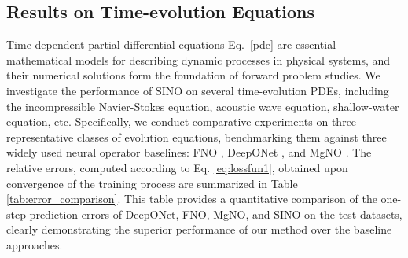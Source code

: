 \documentclass[preprint,numbers,sort&compress]{elsarticle}
\begin{document}
			
			\subsection{Results on Time-evolution Equations} \label{time_results}
			Time-dependent partial differential equations Eq.~\eqref{pde} are essential mathematical models for describing dynamic processes in physical systems, and their numerical solutions form the foundation of forward problem studies. We investigate the performance of SINO on several time-evolution PDEs, including the incompressible Navier-Stokes equation, acoustic wave equation, shallow-water equation, etc. Specifically, we conduct comparative experiments on three representative classes of evolution equations, benchmarking them against three widely used neural operator baselines: FNO \cite{li2020fourier}, DeepONet \cite{LuDeepOnet}, and MgNO \cite{he2024mgno}.
			The relative errors, computed according to Eq. \eqref{eq:lossfun1}, obtained upon convergence of the training process are summarized in Table \ref{tab:error_comparison}. This table provides a quantitative comparison of the one-step prediction errors of DeepONet, FNO, MgNO, and SINO on the test datasets, clearly demonstrating the superior performance of our method over the baseline approaches.
			
\end{document}
